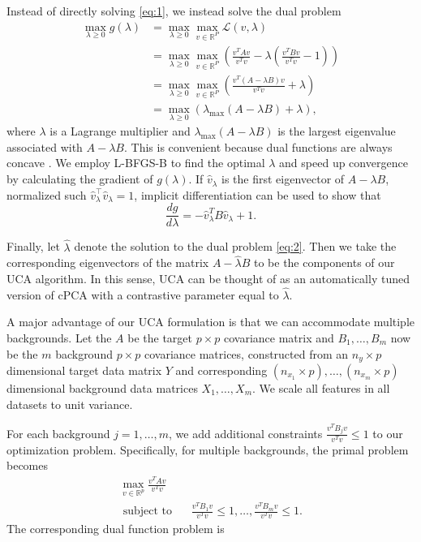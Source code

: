 \documentclass[nocrop]{bioinfo}
\begin{document}
\begin{methods}
Instead of directly solving \eqref{eq:1}, we instead solve the dual problem
\begin{align}
  \max_{\lambda \geq 0}{g(\lambda)} &= \max_{\lambda \geq 0}{\max_{v\in \mathbb{R}^P}{\mathcal{L}}}\left(v,\lambda\right) \nonumber\\
                                    &= \max_{\lambda \geq 0}{\max_{v\in \mathbb{R}^P}{\left( \frac{v^TAv}{v^T v} - \lambda\left(\frac{v^TBv}{v^T v} - 1\right)\right)}} \nonumber\\
                                    &= \max_{\lambda \geq 0}{\max_{v\in \mathbb{R}^P}{\left(\frac{v^T\left(A - \lambda B\right)v}{v^T v} + \lambda\right)}}\nonumber\\
                                        &= \max_{\lambda \geq 0}{\left(\lambda_{\text{max}}\left(A - \lambda B\right) + \lambda\right)}, \label{eq:2}
\end{align}
where $\lambda$ is a Lagrange multiplier and $\lambda_{\max}(A - \lambda B)$ is the largest eigenvalue associated with $A - \lambda B$. This is convenient because dual functions are always concave \cite{boyd2004convex}. We employ L-BFGS-B \cite{byrd1995limited} to find the optimal $\lambda$ and speed up convergence by calculating the gradient of $g(\lambda)$. If $\hat{v}_\lambda$ is the first eigenvector of $A - \lambda B$, normalized such $\hat{v}_{\lambda}^\top \hat{v}_{\lambda} = 1$, implicit differentiation can be used to show that
\[
  \frac{d g}{d \lambda} = - \hat{v}^T _{\lambda} B \hat{v}_{\lambda} + 1.
\]

Finally, let $\hat{\lambda}$ denote the solution to the dual problem \eqref{eq:2}. Then we take the corresponding eigenvectors of the matrix $A - \hat{\lambda} B$ to be the components of our UCA algorithm. In this sense, UCA can be thought of as an automatically tuned version of cPCA with a contrastive parameter equal to $\hat{\lambda}$.


A major advantage of our UCA formulation is that we can accommodate multiple backgrounds. Let the $A$ be the target $p \times p$ covariance matrix and $ B_1, \ldots, B_m$ now be the $m$ background $p \times p$ covariance matrices, constructed from an $n_y \times p$ dimensional target data matrix $Y$ and corresponding $(n_{x_1} \times p), \ldots, (n_{x_m}\times p)$ dimensional background data matrices $X_1, \ldots, X_m$. We scale all features in all datasets to unit variance.


For each background $j = 1, \ldots, m$, we add additional constraints $\frac{v^TB_jv}{v^Tv}\leq 1$ to our optimization problem. Specifically, for multiple backgrounds, the primal problem becomes
\begin{equation}
  \label{eq:4}
  \begin{aligned}
  \max_{v\in \mathbb{R}^p}{\frac{v^TAv}{v^T v}} \\ \text{ subject to }\; \; &\frac{v^TB_1 v}{v^T v} \leq 1, \ldots, \frac{v^T B_m v}{v^T v}\leq 1.
  \end{aligned}
\end{equation}
The corresponding dual function problem is


\end{methods}
\end{document}
